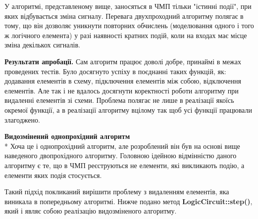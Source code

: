 \documentclass[12pt,a4paper]{article}
\begin{document}
У алгоритмі, представленому вище, заносяться в ЧМП тільки "істинні події", при яких відбувається зміна сигналу. Перевага двухпроходний алгоритму полягає в тому, що він дозволяє уникнути повторних обчислень (моделювання одного і того ж логічного елемента) у разі наявності кратних подій, коли на входах має місце зміна декількох сигналів.

\textbf{Результати апробації.} Сам алгоритм працює доволі добре, принаймі в межах проведених тестів. Було досягнуто успіху в поєднанні таких функцій, як: додавання елементів в схему, підключення елементів між собою, відключення елементів. Але так і не вдалось досягнути коректності роботи алгоритму при видаленні елементів зі схеми. Проблема полягає не лише в реалізації якоїсь окремої функції, а в реалізації алгоритму вцілому так щоб усі функції працювали злагоджено.


\textbf{Видозмінений однопрохідний алгоритм}\\*
Хоча це і однопрохідний алгоритм, але розроблений він був на основі вище наведеного двопрохідного алгоритму. Головною ідейною відмінністю даного алгоритму є те, що в ЧМП реєструються не елементи, які викликають подію, а елементи яких подія стосується.

Такий підхід покликаний вирішити проблему з видаленням елементів, яка виникала в попередньому алгоритмі. Нижче подано метод \textbf{LogicCircuit::step()}, який і являє собою реалізацію видозміненого алгоритму.
\end{document}
